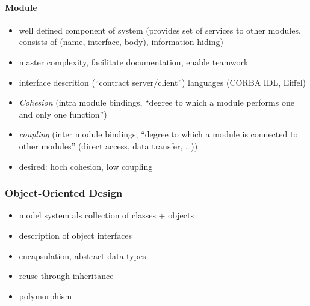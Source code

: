 \documentclass[a4paper, 10pt]{article}
\begin{document}
\paragraph{Module}
\begin{itemize}
	\item well defined component of system (provides set of services to other modules, consists of (name, interface, body), information hiding)
	\item master complexity, facilitate documentation, enable teamwork
	\item interface descrition (``contract server/client'') languages (CORBA IDL, Eiffel)
	\item \emph{Cohesion} (intra module bindings, ``degree to which a module performs one and only one function'')
	\item \emph{coupling} (inter module bindings, ``degree to which a module is connected to other modules'' (direct access, data transfer, \dots))
	\item desired: hoch cohesion, low coupling
\end{itemize}

\subsubsection{Object-Oriented Design}
\begin{itemize}
	\item model system als collection of classes + objects
	\item description of object interfaces
	\item encapsulation, abstract data types
	\item reuse through inheritance
	\item polymorphism
\end{itemize}
\end{document}
